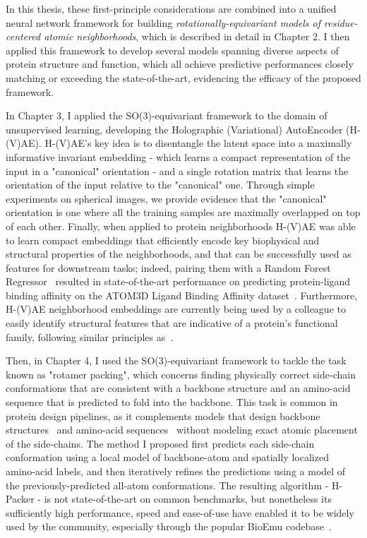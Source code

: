 In this thesis, these first-principle considerations are combined into a unified neural network framework
for building \textit{rotationally-equivariant models of residue-centered atomic neighborhoods}, which is
described in detail in Chapter 2.
I then applied this framework to develop several models spanning diverse aspects of protein structure and function,
which all achieve predictive performances closely matching or exceeding the state-of-the-art,
evidencing the efficacy of the proposed framework.

In Chapter 3, I applied the SO(3)-equivariant framework to the domain of unsupervised learning, developing the Holographic (Variational) AutoEncoder (H-(V)AE).
H-(V)AE's key idea is to disentangle the latent space into a maximally informative invariant embedding - which learns a compact representation
of the input in a "canonical" orientation - and a single rotation matrix that learns the orientation of the input relative to the "canonical" one.
Through simple experiments on spherical images, we provide evidence that the "canonical" orientation is one where all the training samples are
maximally overlapped on top of each other.
Finally, when applied to protein neighborhoods H-(V)AE was able to learn compact embeddings that efficiently encode key biophysical and structural
properties of the neighborhoods, and that can be successfully used as features for downstream tasks; indeed, pairing them with a Random Forest Regressor~\citep{breiman_random_2001}
resulted in state-of-the-art performance on predicting protein-ligand binding affinity on the ATOM3D Ligand Binding Affinity dataset~\citep{townshend_atom3d_2021}.
Furthermore, H-(V)AE neighborhood embeddings are currently being used by a colleague to easily identify structural features that are indicative
of a protein's functional family, following similar principles as~\citep{sael_improved_2010, daberdaku_exploring_2018}.

Then, in Chapter 4, I used the SO(3)-equivariant framework to tackle the task known as "rotamer packing", which concerns finding physically correct side-chain
conformations that are consistent with a backbone structure and an amino-acid sequence that is predicted to fold into the backbone.
This task is common in protein design pipelines, as it complements models that design backbone structures~\citep{watson_novo_2023, lewis_scalable_2025}
and amino-acid sequences~\citep{dauparas_robust_2022} without modeling exact atomic placement of the side-chains.
The method I proposed first predicts each side-chain conformation using a local model of backbone-atom and spatially localized amino-acid labels,
and then iteratively refines the predictions using a model of the previously-predicted all-atom conformations.
The resulting algorithm - H-Packer - is not state-of-the-art on common benchmarks, but nonetheless its sufficiently high performance, speed and ease-of-use
have enabled it to be widely used by the community, especially through the popular BioEmu codebase~\citep{lewis_scalable_2025}.

